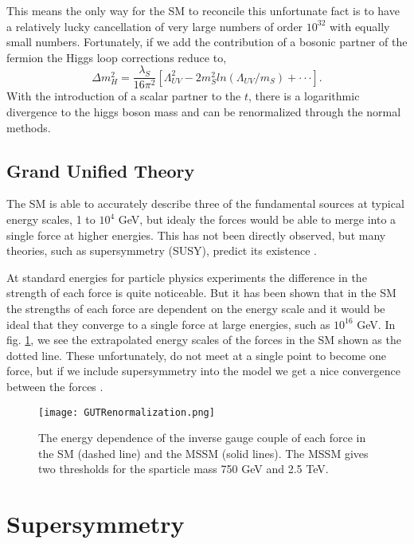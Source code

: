 This means the only way for the SM to reconcile this unfortunate fact is to have a relatively lucky cancellation of very large numbers of order $10^{32}$ with equally small numbers. Fortunately, if we add the contribution of a bosonic partner of the fermion the Higgs loop corrections reduce to,
\begin{equation}
\Delta m_{H}^{2}=\frac{\lambda_{S}}{16\pi^{2}}[\Lambda_{UV}^{2} - 2m_{S}^{2}ln(\Lambda_{UV}/m_{S})+\cdot\cdot\cdot].
\label{HiggsRenormalization}
\end{equation}
With the introduction of a scalar partner to the $t$, there is a logarithmic divergence to the higgs boson mass and can be renormalized through the normal methods.

\subsection{Grand Unified Theory}

The SM is able to accurately describe three of the fundamental sources at typical energy scales, 1 to $10^{4}$ GeV, but idealy the forces would be able to merge into a single force at higher energies. This has not been directly observed, but many theories, such as supersymmetry (SUSY), predict its existence \cite{martin_supersymmetry_1997}.

At standard energies for particle physics experiments the difference in the strength of each force is quite noticeable. But it has been shown that in the SM the strengths of each force are dependent on the energy scale and it would be ideal that they converge to a single force at large energies, such as $10^{16}$ GeV. In fig. \ref{GUT}, we see the extrapolated energy scales of the forces in the SM shown as the dotted line. These unfortunately, do not meet at a single point to become one force, but if we include supersymmetry into the model we get a nice convergence between the forces \cite{martin_supersymmetry_1997}.

\begin{figure}
 	\centering
	\texttt{[image: GUTRenormalization.png]}
 	\caption[GUT Force Energy Dependence]{The energy dependence of the inverse gauge couple of each force in the SM (dashed line) and the MSSM (solid lines). The MSSM gives two thresholds for the sparticle mass 750 GeV and 2.5 TeV.}
 	\label{GUT} 
\end{figure}

\section{Supersymmetry}

